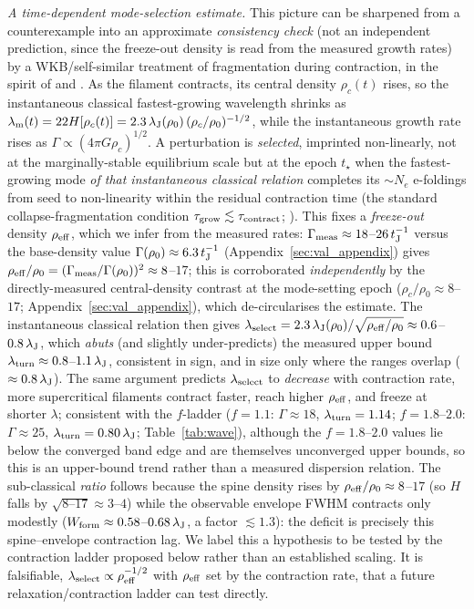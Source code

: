 \documentclass[usenatbib,twoside,twocolumn]{mnras}
\begin{document}
\emph{A time-dependent mode-selection estimate.} This picture can be sharpened from a counterexample into an approximate \emph{consistency check} (not an independent prediction, since the freeze-out density is read from the measured growth rates) by a WKB/self-similar treatment of fragmentation during contraction, in the spirit of \citet{Larson1985} and \citet{Clarke2016,Clarke2017}. As the filament contracts, its central density $\rho_c(t)$ rises, so the instantaneous classical fastest-growing wavelength shrinks as $\lambda_{\rm m}(t)=22H[\rho_c(t)]=2.3\,\lambda_{\rm J}(\rho_0)\,(\rho_c/\rho_0)^{-1/2}$, while the instantaneous growth rate rises as $\Gamma\propto(4\pi G\rho_c)^{1/2}$. A perturbation is \emph{selected}, imprinted non-linearly, not at the marginally-stable equilibrium scale but at the epoch $t_\star$ when the fastest-growing mode \emph{of that instantaneous classical relation} completes its $\sim\!N_e$ e-foldings from seed to non-linearity within the residual contraction time (the standard collapse-fragmentation condition $\tau_{\rm grow}\lesssim\tau_{\rm contract}$; \citealt{Larson1985}). This fixes a \emph{freeze-out} density $\rho_{\rm eff}$, which we infer from the measured rates: $\Gamma_{\rm meas}\approx18$--$26\,t_{\rm J}^{-1}$ versus the base-density value $\Gamma(\rho_0)\approx6.3\,t_{\rm J}^{-1}$ (Appendix~\ref{sec:val_appendix}) gives $\rho_{\rm eff}/\rho_0=(\Gamma_{\rm meas}/\Gamma(\rho_0))^2\approx8$--$17$; this is corroborated \emph{independently} by the directly-measured central-density contrast at the mode-setting epoch ($\rho_c/\rho_0\approx8$--$17$; Appendix~\ref{sec:val_appendix}), which de-circularises the estimate. The instantaneous classical relation then gives $\lambda_{\rm select}=2.3\,\lambda_{\rm J}(\rho_0)/\sqrt{\rho_{\rm eff}/\rho_0}\approx0.6$--$0.8\,\lambda_{\rm J}$, which \emph{abuts} (and slightly under-predicts) the measured upper bound $\lambda_{\rm turn}\approx0.8$--$1.1\,\lambda_{\rm J}$, consistent in sign, and in size only where the ranges overlap ($\approx0.8\,\lambda_{\rm J}$). The same argument predicts $\lambda_{\rm select}$ to \emph{decrease} with contraction rate, more supercritical filaments contract faster, reach higher $\rho_{\rm eff}$, and freeze at shorter $\lambda$; consistent with the $f$-ladder ($f=1.1$: $\Gamma\approx18$, $\lambda_{\rm turn}=1.14$; $f=1.8$--$2.0$: $\Gamma\approx25$, $\lambda_{\rm turn}=0.80\,\lambda_{\rm J}$; Table~\ref{tab:wave}), although the $f=1.8$--$2.0$ values lie below the converged band edge and are themselves unconverged upper bounds, so this is an upper-bound trend rather than a measured dispersion relation. The sub-classical \emph{ratio} follows because the spine density rises by $\rho_{\rm eff}/\rho_0\approx8$--$17$ (so $H$ falls by $\sqrt{8\text{--}17}\approx3$--$4$) while the observable envelope FWHM contracts only modestly ($W_{\rm form}\approx0.58$--$0.68\,\lambda_{\rm J}$, a factor $\lesssim1.3$): the deficit is precisely this spine--envelope contraction lag. We label this a hypothesis to be tested by the contraction ladder proposed below rather than an established scaling. It is falsifiable, $\lambda_{\rm select}\propto\rho_{\rm eff}^{-1/2}$ with $\rho_{\rm eff}$ set by the contraction rate, that a future relaxation/contraction ladder can test directly.
\end{document}
